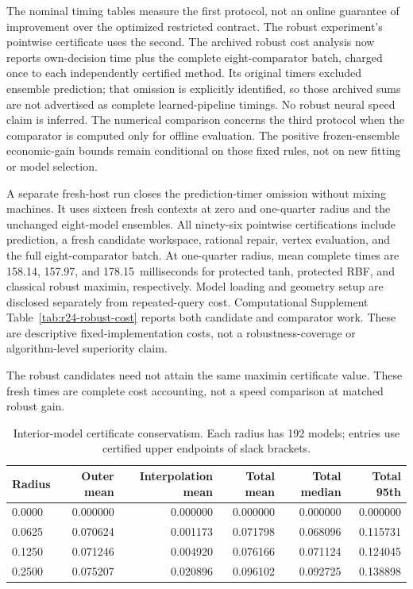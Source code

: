 \documentclass[11pt,letterpaper]{article}
\theoremstyle{definition}
\newcommand{\1}{\mathbf 1}
\newcommand{\RTwentyFourRobustTanh}{158.14}
\newcommand{\RTwentyFourRobustRBF}{157.97}
\newcommand{\RTwentyFourRobustClassical}{178.15}
\begin{document}
The nominal timing tables measure the first protocol, not an online guarantee
of improvement over the optimized restricted contract. The robust experiment's
pointwise certificate uses the second. The archived robust cost analysis now
reports own-decision time plus the complete eight-comparator batch, charged
once to each independently certified method. Its original timers excluded
ensemble prediction; that omission is explicitly identified, so those archived
sums are not advertised as complete learned-pipeline timings. No robust neural
speed claim is inferred. The numerical comparison concerns the third protocol
when the comparator is computed only for offline evaluation. The positive
frozen-ensemble economic-gain bounds remain conditional on those fixed rules,
not on new fitting or model selection.


A separate fresh-host run closes the prediction-timer omission without mixing
machines. It uses sixteen fresh contexts at zero and one-quarter radius and
the unchanged eight-model ensembles. All ninety-six pointwise certifications
include prediction, a fresh candidate workspace, rational repair, vertex
evaluation, and the full eight-comparator batch. At one-quarter radius, mean
complete times are \RTwentyFourRobustTanh, \RTwentyFourRobustRBF, and
\RTwentyFourRobustClassical\ milliseconds for protected tanh, protected RBF,
and classical robust maximin, respectively. Model loading and geometry setup
are disclosed separately from repeated-query cost. Computational Supplement
Table~\ref{tab:r24-robust-cost} reports both candidate and comparator work.
These are descriptive fixed-implementation costs, not a robustness-coverage
or algorithm-level superiority claim.

The robust candidates need not attain the same maximin certificate value. These fresh times are complete cost accounting, not a speed comparison at matched robust gain.

\begin{table}[tbp]\centering\small\setlength{\tabcolsep}{4pt}
\caption{Interior-model certificate conservatism. Each radius has 192 models; entries use certified upper endpoints of slack brackets.}
\label{tab:r24-tightness}
\begin{tabular}{lrrrrr}
\toprule
Radius & Outer mean & Interpolation mean & Total mean & Total median & Total 95th\\
\midrule
0.0000 & 0.000000 & 0.000000 & 0.000000 & 0.000000 & 0.000000\\
0.0625 & 0.070624 & 0.001173 & 0.071798 & 0.068096 & 0.115731\\
0.1250 & 0.071246 & 0.004920 & 0.076166 & 0.071124 & 0.124045\\
0.2500 & 0.075207 & 0.020896 & 0.096102 & 0.092725 & 0.138898\\
\bottomrule
\end{tabular}
\end{table}
\end{document}
